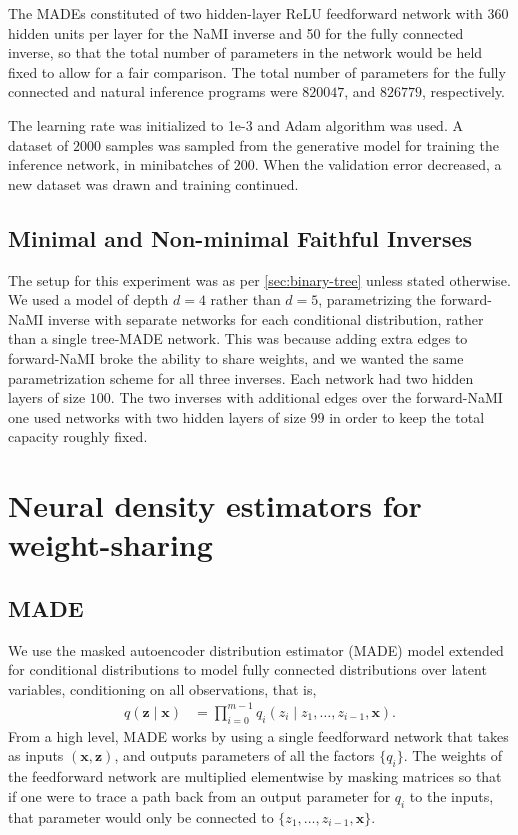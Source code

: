 \documentclass{article}
\begin{document}
The MADEs constituted of two hidden-layer ReLU feedforward network with 360 hidden units per layer for the NaMI inverse and 50 for the fully connected inverse, so that the total number of parameters in the network would be held fixed to allow for a fair comparison. The total number of parameters for the fully connected and natural inference programs were $820047$, and $826779$, respectively.

The learning rate was initialized to {\ttfamily 1e-3} and Adam algorithm was used. A dataset of $2000$ samples was sampled from the generative model for training the inference network, in minibatches of $200$. When the validation error decreased, a new dataset was drawn and training continued.

\subsection{Minimal and Non-minimal Faithful Inverses}
The setup for this experiment was as per \ref{sec:binary-tree} unless stated otherwise. We used a model of depth $d=4$ rather than $d=5$, parametrizing the forward-NaMI inverse with separate networks for each conditional distribution, rather than a single tree-MADE network. This was because adding extra edges to forward-NaMI broke the ability to share weights, and we wanted the same parametrization scheme for all three inverses. Each network had two hidden layers of size $100$. The two inverses with additional edges over the forward-NaMI one used networks with two hidden layers of size $99$ in order to keep the total capacity roughly fixed.

\section{Neural density estimators for weight-sharing}
\subsection{MADE}
We use the masked autoencoder distribution estimator (MADE) model \citep{GermainEtAl2015} extended for conditional distributions \citep{PaigeWood2016} to model fully connected distributions over latent variables, conditioning on all observations, that is,
\begin{align*}
	q(\mathbf{z}\mid\mathbf{x}) &= \prod^{m-1}_{i=0}q_i(z_i\mid z_1,\ldots,z_{i-1},\mathbf{x}).
\end{align*}
From a high level, MADE works by using a single feedforward network that takes as inputs $(\mathbf{x},\mathbf{z})$, and outputs parameters of all the factors $\{q_i\}$.
The weights of the feedforward network are multiplied elementwise by masking matrices so that if one were to trace a path back from an output parameter for $q_i$ to the inputs, that parameter would only be connected to $\{z_1,\ldots,z_{i-1},\mathbf{x}\}$.
\end{document}
